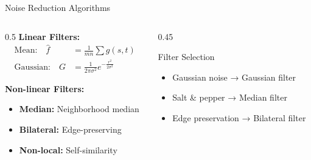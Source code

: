 \documentclass[aspectratio=169,10pt]{beamer}
\begin{document}
\begin{frame}{Noise Reduction Algorithms}
\begin{columns}
\begin{column}{0.5\textwidth}
\textbf{Linear Filters:}
\begin{align}
\text{Mean:} \quad \hat{f} &= \frac{1}{mn} \sum g(s,t) \\
\text{Gaussian:} \quad G &= \frac{1}{2\pi\sigma^2} e^{-\frac{r^2}{2\sigma^2}}
\end{align}

\textbf{Non-linear Filters:}
\begin{itemize}
\item \textbf{Median:} Neighborhood median
\item \textbf{Bilateral:} Edge-preserving
\item \textbf{Non-local:} Self-similarity
\end{itemize}
\end{column}
\begin{column}{0.45\textwidth}
\begin{alertblock}{Filter Selection}
\begin{itemize}
\item Gaussian noise → Gaussian filter
\item Salt \& pepper → Median filter
\item Edge preservation → Bilateral filter
\end{itemize}
\end{alertblock}
\end{column}
\end{columns}
\end{frame}
\end{document}
